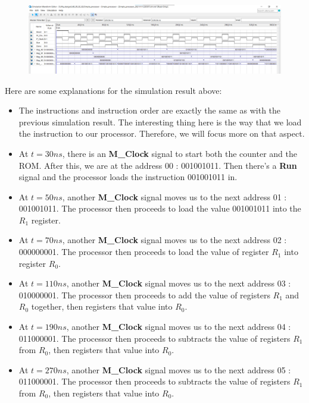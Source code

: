 \begin{figure}[h]
    \centering
    \includegraphics[width=6.1in]{source/picture/Lab09/Simple_Processor_W_Counter_Simulation.png}
\end{figure}

Here are some explanations for the simulation result above:
\begin{itemize}
    \item The instructions and instruction order are exactly the same as with the previous simulation result. The interesting thing here is the way that we load the instruction to our processor. Therefore, we will focus more on that aspect.
    \item At $t=30ns$, there is an \textbf{M\_Clock} signal to start both the counter and the ROM. After this, we are at the address 00 : 001001011. Then there's a \textbf{Run} signal and the processor loads the instruction 001001011 in.
    \item At $t=50ns$, another \textbf{M\_Clock} signal moves us to the next address 01 : 001001011. The processor then proceeds to load the value 001001011 into the $R_1$ register.
    \item At $t=70ns$, another \textbf{M\_Clock} signal moves us to the next address 02 : 000000001. The processor then proceeds to load the value of register $R_1$ into register $R_0$.
    \item At $t=110ns$, another \textbf{M\_Clock} signal moves us to the next address 03 : 010000001. The processor then proceeds to add the value of registers $R_1$ and $R_0$ together, then registers that value into $R_0$.
    \item At $t=190ns$, another \textbf{M\_Clock} signal moves us to the next address 04 : 011000001. The processor then proceeds to subtracts the value of registers $R_1$ from $R_0$, then registers that value into $R_0$.
    \item At $t=270ns$, another \textbf{M\_Clock} signal moves us to the next address 05 : 011000001. The processor then proceeds to subtracts the value of registers $R_1$ from $R_0$, then registers that value into $R_0$.
\end{itemize}